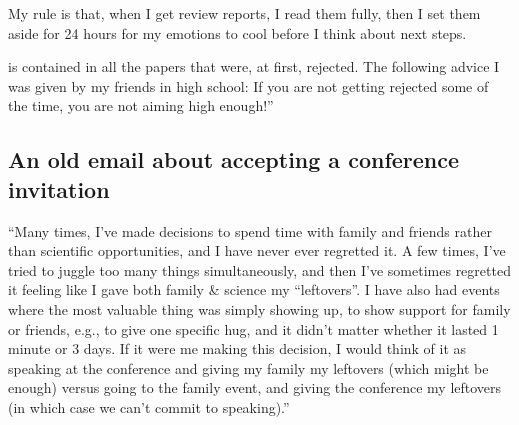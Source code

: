 \documentclass[letterpaper,10pt,english]{sphinxmanual}
\begin{document}
\sphinxAtStartPar
My rule is that, when I get review reports, I read them fully, then I set them aside for 24 hours for my emotions to cool before I think about next steps.

\sphinxAtStartPar
{} is contained in all the papers that were, at first, rejected. The following advice I was given by my friends in high school: If you are not getting rejected some of the time, you are not aiming high enough!”


\subsection{An old e\sphinxhyphen{}mail about accepting a conference invitation}
\label{\detokenize{OldEmails:an-old-e-mail-about-accepting-a-conference-invitation}}
\sphinxAtStartPar
“Many times, I’ve made decisions to spend time with family and friends rather than scientific opportunities, and I have never ever regretted it. A few times, I’ve tried to juggle too many things simultaneously, and then I’ve sometimes regretted it \textendash{} feeling like I gave both family \& science my “leftovers”. I have also had events where the most valuable thing was simply showing up, to show support for family or friends, e.g., to give one specific hug, and it didn’t matter whether it lasted 1 minute or 3 days. If it were me making this decision, I would think of it as speaking at the conference and giving my family my leftovers (which might be enough) versus going to the family event, and giving the conference my leftovers (in which case we can’t commit to speaking).”
\end{document}
